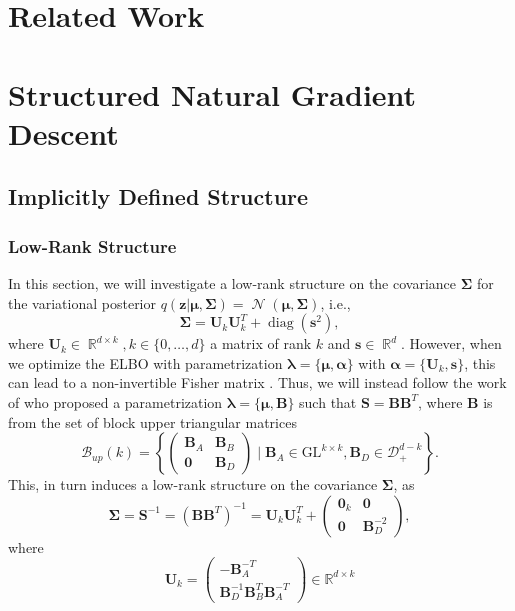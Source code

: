\documentclass[a4paper, 11pt, oneside]{scrartcl}
\theoremstyle{break}
\DeclareMathOperator{\Normal}{\mathcal{N}}
\DeclareMathOperator{\Real}{\mathbb{R}}
\DeclareMathOperator{\diag}{diag}
\newcommand{\matr}[1]{\boldsymbol{#1}}
\newcommand{\set}[1]{\mathcal{#1}}
\numberwithin{equation}{section}
\begin{document}
	\section{Related Work}

	\section{Structured Natural Gradient Descent}
		\subsection{Implicitly Defined Structure}

			\subsubsection{Low-Rank Structure}
				In this section, we will investigate a low-rank structure on the covariance $\matr{\Sigma}$ for the variational posterior $q(\matr{z} | \matr{\mu}, \matr{\Sigma}) = \Normal(\matr{\mu}, \matr{\Sigma})$, i.e., 
					$$\matr{\Sigma} = \matr{U}_k \matr{U}_k^T + \diag(\matr{s}^2),$$ 
				where $\matr{U}_k \in \Real^{d \times k}, k \in \{0, \dots, d\}$ a matrix of rank $k$ and $\matr{s} \in \Real^d.$
				However, when we optimize the ELBO with parametrization $\matr{\lambda} = \{\matr{\mu}, \matr{\alpha}\}$ with $\matr{\alpha} = \{\matr{U}_k, \matr{s}\}$, this can lead to a non-invertible Fisher matrix \parencite[Sec. J.1.6]{LNK+21}. 
				Thus, we will instead follow the work of \parencite{LNK+21} who proposed a parametrization $\matr{\lambda} = \{\matr{\mu}, \matr{B}\}$ such that $\matr{S} = \matr{B} \matr{B}^T$, where $\matr{B}$ is from the set of block upper triangular matrices
					$$\set{B}_{up}(k) = \left\{\begin{pmatrix} \matr{B}_A & \matr{B}_B \\
														        \matr{0}  & \matr{B}_D
										  \end{pmatrix} \mid \matr{B}_A \in \text{GL}^{k \times k}, \matr{B}_D \in \set{D}_+^{d-k}\right\}.$$
				This, in turn induces a low-rank structure on the covariance $\matr{\Sigma}$, as 
				$$\matr{\Sigma} = \matr{S}^{-1} = (\matr{B} \matr{B}^T)^{-1} = \matr{U}_k \matr{U}_k^T + \begin{pmatrix} \matr{0}_k & \matr{0} \\ \matr{0} & \matr{B}_D^{-2}\end{pmatrix},$$
				where 
				$$\matr{U}_k = \begin{pmatrix} -\matr{B}_A^{-T} \\ \matr{B}_D^{-1} \matr{B}_B^T \matr{B}_A^{-T}\end{pmatrix} \in \mathbb{R}^{d \times k}$$
\end{document}

